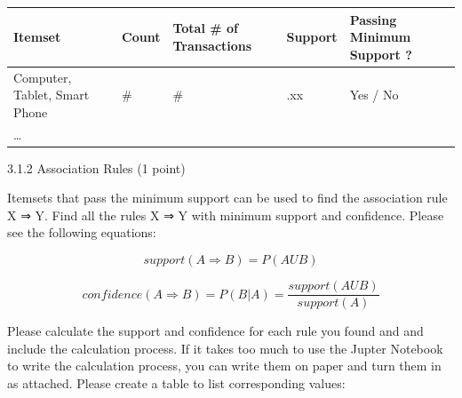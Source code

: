\documentclass[
  letterpaper,
]{scrbook}
\newcounter{none} %
\begin{document}
{\def\LTcaptype{none} %
\begin{longtable}[]{@{}
  >{\raggedright\arraybackslash}p{}
  >{\raggedright\arraybackslash}p{}
  >{\raggedright\arraybackslash}p{}
  >{\raggedright\arraybackslash}p{}
  >{\raggedright\arraybackslash}p{}@{}}
\toprule\noalign{}
\begin{minipage}[b]{\linewidth}\raggedright
Itemset
\end{minipage} & \begin{minipage}[b]{\linewidth}\raggedright
Count
\end{minipage} & \begin{minipage}[b]{\linewidth}\raggedright
Total \# of Transactions
\end{minipage} & \begin{minipage}[b]{\linewidth}\raggedright
Support
\end{minipage} & \begin{minipage}[b]{\linewidth}\raggedright
Passing Minimum Support ?
\end{minipage} \\
\midrule\noalign{}
\endhead
\bottomrule\noalign{}
\endlastfoot
Computer, Tablet, Smart Phone & \# & \# & .xx & Yes / No \\
\ldots{} & & & & \\
\end{longtable}
}

3.1.2 Association Rules (1 point)

Itemsets that pass the minimum support can be used to find the
association rule X ⇒ Y. Find all the rules X ⇒ Y with minimum support
and confidence. Please see the following equations:

\[ support (A⇒B) =  P(AUB) \]

\[ confidence (A⇒B) =  P(B|A) = \frac{support(AUB)}{support(A)} \]

Please calculate the support and confidence for each rule you found and
and include the calculation process. If it takes too much to use the
Jupter Notebook to write the calculation process, you can write them on
paper and turn them in as attached. Please create a table to list
corresponding values:
\end{document}

